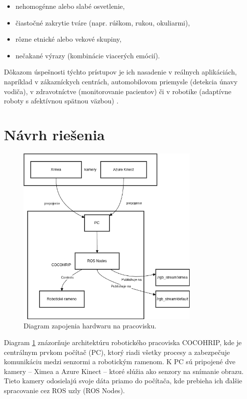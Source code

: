 \begin{itemize}
    \item nehomogénne alebo slabé osvetlenie,
    \item čiastočné zakrytie tváre (napr. rúškom, rukou, okuliarmi),
    \item rôzne etnické alebo vekové skupiny,
    \item nečakané výrazy (kombinácie viacerých emócií).
\end{itemize}

Dôkazom úspešnosti týchto prístupov je ich nasadenie v reálnych aplikáciách, napríklad v zákazníckych centrách, automobilovom priemysle (detekcia únavy vodiča), v zdravotníctve (monitorovanie pacientov) či v robotike (adaptívne roboty s afektívnou spätnou väzbou) \cite{inProceedings01}.


\section{Návrh riešenia}        %
\label{sec:solution_design}
\begin{figure}[!htpb]
    \centering
    \includegraphics[width=0.8\textwidth]{img/main_diagram.png}
    \caption{Diagram zapojenia hardwaru na pracovisku.}
    \label{fig:main_diagram}
\end{figure}
Diagram \ref{fig:main_diagram} znázorňuje architektúru robotického pracoviska COCOHRIP, kde je centrálnym prvkom počítač (PC), ktorý riadi všetky procesy a zabezpečuje komunikáciu medzi senzormi a robotickým ramenom. K PC sú pripojené dve kamery – Ximea a Azure Kinect – ktoré slúžia ako senzory na snímanie obrazu. Tieto kamery odosielajú svoje dáta priamo do počítača, kde prebieha ich ďalšie spracovanie cez ROS uzly (ROS Nodes).

